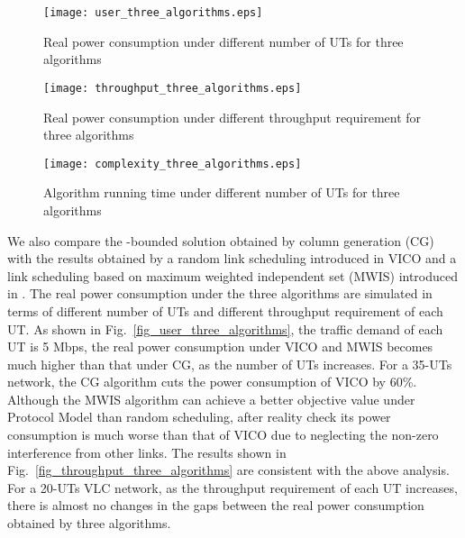 \documentclass[10pt,journal]{IEEEtran}
\begin{document}
\begin{figure*}
  \centering
  \begin{minipage}[t]{.327\linewidth}
    \texttt{[image: user\_three\_algorithms.eps]}
  \vspace{-10pt}
  \caption{Real power consumption under different number of UTs for three algorithms}
  \vspace{-2pt}
  \label{fig_user_three_algorithms}
  \end{minipage}
  \begin{minipage}[t]{.327\linewidth}
   \texttt{[image: throughput\_three\_algorithms.eps]}
  \vspace{-10pt}
  \caption{Real power consumption under different throughput requirement for three algorithms}
  \vspace{-2pt}
  \label{fig_throughput_three_algorithms}
  \end{minipage}
  \begin{minipage}[t]{.327\linewidth}
    \texttt{[image: complexity\_three\_algorithms.eps]}
  \vspace{-10pt}
  \caption{Algorithm running time under different number of UTs for three algorithms}
  \vspace{-2pt}
  \label{fig_complexity_three_algorithms}
  \end{minipage}
\end{figure*}


We also compare the -bounded solution obtained by column generation (CG) with the results obtained by a random link scheduling introduced in VICO \cite{li2012vico} and a link scheduling based on maximum weighted independent set (MWIS) introduced in \cite{tao2015scheduling}. The real power consumption under the three algorithms are simulated in terms of different number of UTs and different throughput requirement of each UT. As shown in Fig.~\ref{fig_user_three_algorithms}, the traffic demand of each UT is 5 Mbps, the real power consumption under VICO and MWIS becomes much higher than that under CG, as the number of UTs increases. For a 35-UTs network, the CG algorithm cuts the power consumption of VICO by 60\%. Although the MWIS algorithm can achieve a better objective value under Protocol Model than random scheduling, after reality check its power consumption is much worse than that of VICO due to neglecting the non-zero interference from other links. The results shown in Fig.~\ref{fig_throughput_three_algorithms} are consistent with the above analysis. For a 20-UTs VLC network, as the throughput requirement of each UT increases, there is almost no changes in the gaps between the real power consumption obtained by three algorithms.
\end{document}
